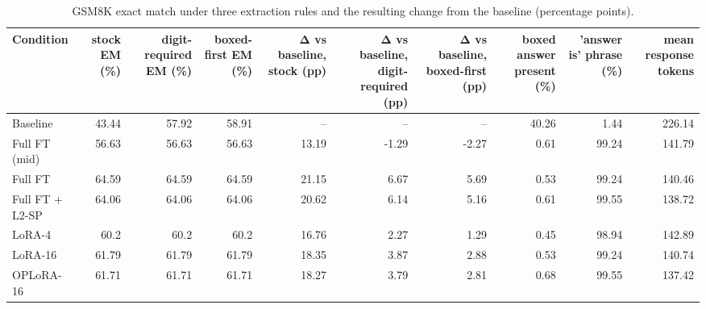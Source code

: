\begin{table}[t]
\centering\small
\begin{tabular}{lrrrrrrrrr}
\toprule
Condition & stock EM (\%) & digit-required EM (\%) & boxed-first EM (\%) & Δ vs baseline, stock (pp) & Δ vs baseline, digit-required (pp) & Δ vs baseline, boxed-first (pp) & boxed answer present (\%) & 'answer is' phrase (\%) & mean response tokens \\
\midrule
Baseline & 43.44 & 57.92 & 58.91 & – & – & – & 40.26 & 1.44 & 226.14 \\
Full FT (mid) & 56.63 & 56.63 & 56.63 & 13.19 & -1.29 & -2.27 & 0.61 & 99.24 & 141.79 \\
Full FT & 64.59 & 64.59 & 64.59 & 21.15 & 6.67 & 5.69 & 0.53 & 99.24 & 140.46 \\
Full FT + L2-SP & 64.06 & 64.06 & 64.06 & 20.62 & 6.14 & 5.16 & 0.61 & 99.55 & 138.72 \\
LoRA-4 & 60.2 & 60.2 & 60.2 & 16.76 & 2.27 & 1.29 & 0.45 & 98.94 & 142.89 \\
LoRA-16 & 61.79 & 61.79 & 61.79 & 18.35 & 3.87 & 2.88 & 0.53 & 99.24 & 140.74 \\
OPLoRA-16 & 61.71 & 61.71 & 61.71 & 18.27 & 3.79 & 2.81 & 0.68 & 99.55 & 137.42 \\
\bottomrule
\end{tabular}
\caption{GSM8K exact match under three extraction rules and the resulting change from the baseline (percentage points).}
\label{tab:task1_gsm8k_sensitivity}
\end{table}
